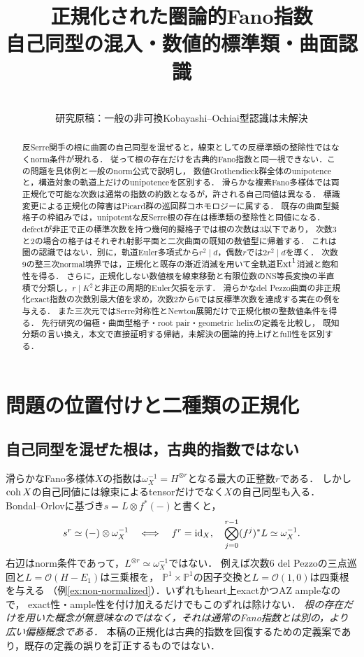 \documentclass[11pt,a4paper]{ltjsarticle}
\title{正規化された圏論的Fano指数\\自己同型の混入・数値的標準類・曲面認識}
\author{}
\date{\versiondate\\研究原稿：一般の非可換Kobayashi--Ochiai型認識は未解決}
\begin{document}
\maketitle
\begin{abstract}
反Serre関手の根に曲面の自己同型を混ぜると，線束としての反標準類の整除性ではなくnorm条件が現れる．
従って根の存在だけを古典的Fano指数と同一視できない．この問題を具体例と一般のnorm公式で説明し，
数値Grothendieck群全体のunipotenceと，構造対象の軌道上だけのunipotenceを区別する．
滑らかな複素Fano多様体では両正規化で可能な次数は通常の指数の約数となるが，許される自己同値は異なる．
標識変更による正規化の障害はPicard群の巡回群コホモロジーに属する．
既存の曲面型擬格子の枠組みでは，unipotentな反Serre根の存在は標準類の整除性と同値になる．
defectが非正で正の標準次数を持つ幾何的擬格子では根の次数は3以下であり，
次数3と2の場合の格子はそれぞれ射影平面と二次曲面の既知の数値型に帰着する．
これは圏の認識ではない．別に，軌道Euler多項式から$r^2\mid d$，偶数$r$では$2r^2\mid d$を導く．
次数9の整三次normal境界では，正規化と既存の漸近消滅を用いて全軌道$\operatorname{Ext}^1$消滅と飽和性を得る．
さらに，正規化しない数値根を線束移動と有限位数のNS等長変換の半直積で分類し，\(r\mid K^2\)と非正の周期的Euler欠損を示す．
滑らかなdel Pezzo曲面の非正規化exact指数の次数別最大値を求め，次数2から6では反標準次数を達成する実在の例を与える．
また三次元ではSerre対称性とNewton展開だけで正規化根の整数値条件を得る．
先行研究の偏極・曲面型格子・root pair・geometric helixの定義を比較し，
既知分類の言い換え，本文で直接証明する帰結，未解決の圏論的持上げとfull性を区別する．
\end{abstract}
{\small\tableofcontents}

\section{問題の位置付けと二種類の正規化}
\subsection{自己同型を混ぜた根は，古典的指数ではない}\label{subsec:warning}
滑らかなFano多様体$X$の指数は$\omega_X^{-1}=H^{\otimes r}$となる最大の正整数$r$である．
しかし$\operatorname{coh} X$の自己同値には線束によるtensorだけでなく$X$の自己同型も入る．
Bondal--Orlov\cite[Theorem 3.1]{BO}に基づき$s=L\otimes f^*(-)$と書くと，
\begin{equation}\label{eq:intro-norm}
 s^r\simeq(-)\otimes\omega_X^{-1}
 \quad\Longleftrightarrow\quad
 f^r=\operatorname{id}_X,\quad\bigotimes_{j=0}^{r-1}(f^j)^*L\simeq\omega_X^{-1}.
\end{equation}
右辺はnorm条件であって，$L^{\otimes r}\simeq\omega_X^{-1}$ではない．
例えば次数6 del Pezzoの三点巡回と$L=\mathcal O(H-E_1)$は三乗根を，
$\mathbb P^1\times\mathbb P^1$の因子交換と$L=\mathcal O(1,0)$は四乗根を与える
（例\ref{ex:non-normalized}）．いずれもheart上exactかつAZ ampleなので，
exact性・ample性を付け加えるだけでもこのずれは除けない．
\emph{根の存在だけを用いた概念が無意味なのではなく，それは通常のFano指数とは別の，より広い偏極概念である．}
本稿の正規化は古典的指数を回復するための定義案であり，既存の定義の誤りを訂正するものではない．
\end{document}
